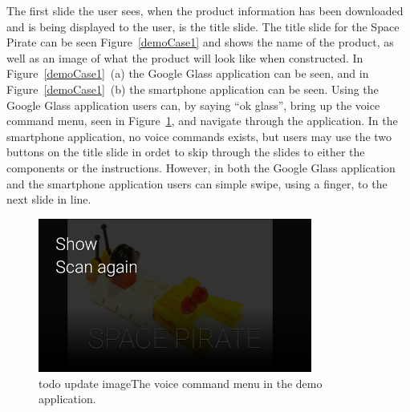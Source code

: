 The first slide the user sees, when the product information has been downloaded and is being displayed to the user, is the title slide. The title slide for the Space Pirate can be seen Figure~\ref{demoCase1} and shows the name of the product, as well as an image of what the product will look like when constructed. In Figure~\ref{demoCase1}~(a) the Google Glass application can be seen, and in Figure~\ref{demoCase1}~(b) the smartphone application can be seen. Using the Google Glass application users can, by saying ``ok glass'', bring up the voice command menu, seen in Figure~\ref{demoCaseVoiceCommand}, and navigate through the application. In the smartphone application, no voice commands exists, but users may use the two buttons on the title slide in ordet to skip through the slides to either the components or the instructions. However, in both the Google Glass application and the smartphone application users can simple swipe, using a finger, to the next slide in line. 

	\begin{figure}[ht!]
		\centering
		\includegraphics[width=90mm]{images/demo/voiceCommand1}
		\caption{todo update imageThe voice command menu in the demo application.}
		\label{demoCaseVoiceCommand}
	\end{figure}


